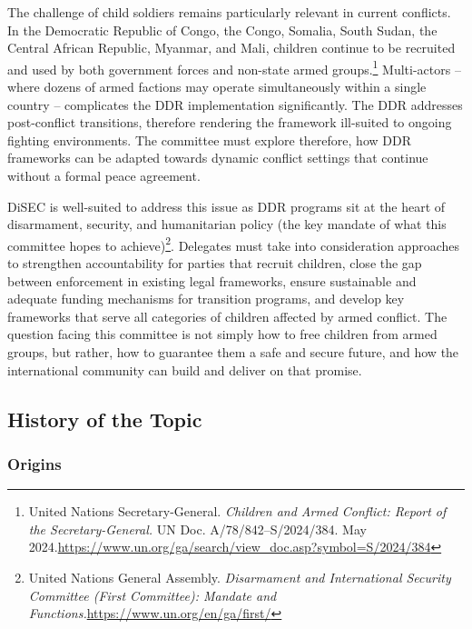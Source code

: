 The challenge of child soldiers remains particularly relevant in current conflicts. In the Democratic Republic of Congo, the Congo, Somalia, South Sudan, the Central African Republic, Myanmar, and Mali, children continue to be recruited and used by both government forces and non-state armed groups.\footnote{United Nations Secretary-General. \emph{Children and Armed Conflict: Report of the Secretary-General.} UN Doc. A/78/842–S/2024/384. May 2024.\url{https://www.un.org/ga/search/view_doc.asp?symbol=S/2024/384}} Multi-actors – where dozens of armed factions may operate simultaneously within a single country – complicates the DDR implementation significantly. The DDR addresses post-conflict transitions, therefore rendering the framework ill-suited to ongoing fighting environments. The committee must explore therefore, how DDR frameworks can be adapted towards dynamic conflict settings that continue without a formal peace agreement.

DiSEC is well-suited to address this issue as DDR programs sit at the heart of disarmament, security, and humanitarian policy (the key mandate of what this committee hopes to achieve)\footnote{United Nations General Assembly. \emph{Disarmament and International Security Committee (First Committee): Mandate and Functions.}\url{https://www.un.org/en/ga/first/}}. Delegates must take into consideration approaches to strengthen accountability for parties that recruit children, close the gap between enforcement in existing legal frameworks, ensure sustainable and adequate funding mechanisms for transition programs, and develop key frameworks that serve all categories of children affected by armed conflict. The question facing this committee is not simply how to free children from armed groups, but rather, how to guarantee them a safe and secure future, and how the international community can build and deliver on that promise.

\subsection{History of the Topic}

\subsubsection{Origins}

